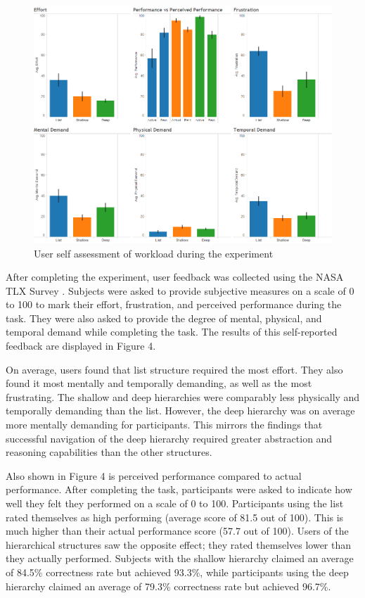 \documentclass{sigchi}
\begin{document}
\begin{figure}[!h]
    \centering
    \includegraphics[width=0.9\columnwidth]{fig_nasaSummary}
    \caption{User self assessment of workload during the experiment}
    \label{fig: Figure4}
\end{figure}

After completing the experiment, user feedback was collected using the NASA TLX Survey \cite{NASA1986}. Subjects were asked to provide subjective measures on a scale of 0 to 100 to mark their effort, frustration, and perceived performance during the task. They were also asked to provide the degree of mental, physical, and temporal demand while completing the task. The results of this self-reported feedback are displayed in Figure 4.


On average, users found that list structure required the most effort. They also found it most mentally and temporally demanding, as well as the most frustrating. The shallow and deep hierarchies were comparably less physically and temporally demanding than the list. However, the deep hierarchy was on average more mentally demanding for participants. This mirrors the findings \cite{Medhi2013a} that successful navigation of the deep hierarchy required greater abstraction and reasoning capabilities than the other structures.

Also shown in Figure 4 is perceived performance compared to actual performance. After completing the task, participants were asked to indicate how well they felt they performed on a scale of 0 to 100. Participants using the list rated themselves as high performing (average score of 81.5 out of 100). This is much higher than their actual performance score (57.7 out of 100). Users of the hierarchical structures saw the opposite effect; they rated themselves lower than they actually performed. Subjects with the shallow hierarchy claimed an average of 84.5\% correctness rate but achieved 93.3\%, while participants using the deep hierarchy claimed an average of 79.3\% correctness rate but achieved 96.7\%.
\end{document}
